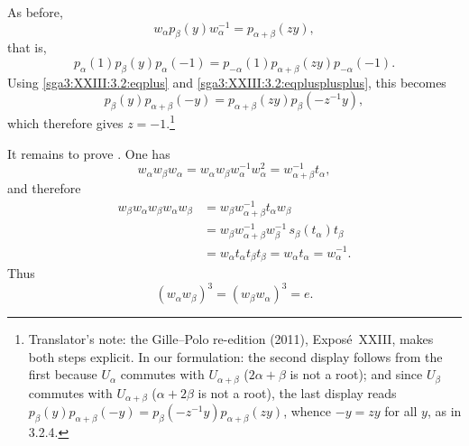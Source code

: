 As before,
\[
  w_\alpha p_\beta(y)w_\alpha^{-1}=p_{\alpha+\beta}(zy),
\]
that is,
\[
  p_\alpha(1)p_\beta(y)p_\alpha(-1)
    =p_{-\alpha}(1)p_{\alpha+\beta}(zy)p_{-\alpha}(-1).
\]
Using \eqref{sga3:XXIII:3.2:eqplus} and
\eqref{sga3:XXIII:3.2:eqplusplusplus}, this becomes
\[
  p_\beta(y)p_{\alpha+\beta}(-y)
    =p_{\alpha+\beta}(zy)p_\beta(-z^{-1}y),
\]
which therefore gives \(z=-1\).\footnote{Translator's note: the Gille--Polo re-edition (2011), Exposé~XXIII, makes both
steps explicit. In our formulation: the second display follows from the first because
\(U_\alpha\) commutes with \(U_{\alpha+\beta}\) (\(2\alpha+\beta\) is not a root); and since
\(U_\beta\) commutes with \(U_{\alpha+\beta}\) (\(\alpha+2\beta\) is not a root), the last
display reads \(p_\beta(y)p_{\alpha+\beta}(-y)=p_\beta(-z^{-1}y)p_{\alpha+\beta}(zy)\),
whence \(-y=zy\) for all \(y\), as in 3.2.4.}

It remains to prove . One has
\[
  w_\alpha w_\beta w_\alpha
    =w_\alpha w_\beta w_\alpha^{-1}w_\alpha^2
    =w_{\alpha+\beta}^{-1}t_\alpha,
\]
and therefore
\[
\begin{aligned}
  w_\beta w_\alpha w_\beta w_\alpha w_\beta
    &=w_\beta w_{\alpha+\beta}^{-1}t_\alpha w_\beta\\
    &=w_\beta w_{\alpha+\beta}^{-1}w_\beta^{-1}
      \,s_\beta(t_\alpha)t_\beta\\
    &=w_\alpha t_\alpha t_\beta t_\beta
      =w_\alpha t_\alpha=w_\alpha^{-1}.
\end{aligned}
\]
Thus
\[
  (w_\alpha w_\beta)^3=(w_\beta w_\alpha)^3=e.
\]


